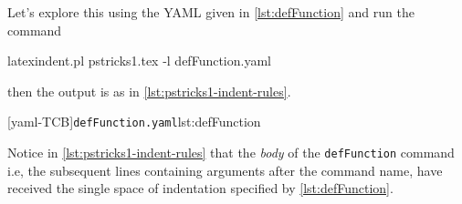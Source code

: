  \begin{example}
 Let's explore this using the YAML given in \cref{lst:defFunction} and run the command

 \begin{commandshell}
latexindent.pl pstricks1.tex -l defFunction.yaml
\end{commandshell}

 then the output is as in \cref{lst:pstricks1-indent-rules}.

 \begin{cmhtcbraster}[raster column skip=.1\linewidth]
  [yaml-TCB]{\texttt{defFunction.yaml}}{lst:defFunction}
 \end{cmhtcbraster}

 Notice in \cref{lst:pstricks1-indent-rules} that the \emph{body} of the
 \lstinline!defFunction! command i.e, the subsequent lines containing arguments after the
 command name, have received the single space of indentation specified by
 \cref{lst:defFunction}.
 \end{example}

